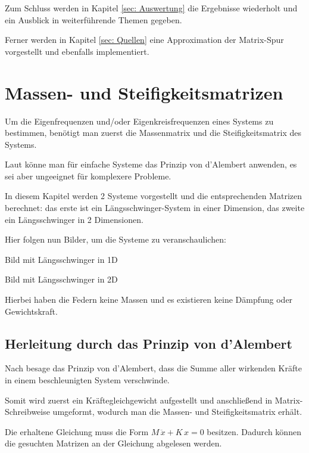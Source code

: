 \documentclass[ngerman,BCOR=4mm]{tudscrreprt}
\theoremstyle{plain} %
\theoremstyle{definition} %
\theoremstyle{remark}
\begin{document}
      Zum Schluss werden in Kapitel \ref{sec: Auswertung} die Ergebnisse wiederholt und ein Ausblick in weiterführende Themen gegeben.

      Ferner werden in Kapitel \ref{sec: Quellen} eine Approximation der Matrix-Spur vorgestellt und ebenfalls implementiert.

\chapter{Massen- und Steifigkeitsmatrizen}
\label{sec: MS Matrizen}
      Um die Eigenfrequenzen und/oder Eigenkreisfrequenzen \w eines Systems zu bestimmen, benötigt man zuerst die Massenmatrix \M und die Steifigkeitsmatrix \K des Systems.

      Laut \cite[S. 366]{maschinendynamikDresig} könne man für einfache Systeme das Prinzip von d'Alembert anwenden, es sei aber ungeeignet für komplexere Probleme.
            
      In diesem Kapitel werden 2 Systeme vorgestellt und die entsprechenden Matrizen berechnet:
      das erste ist ein Längsschwinger-System in einer Dimension, das zweite ein Längsschwinger in 2 Dimensionen.

      Hier folgen nun Bilder, um die Systeme zu veranschaulichen:

      Bild mit Längsschwinger in 1D

      Bild mit Längsschwinger in 2D

      Hierbei haben die Federn keine Massen und es existieren keine Dämpfung oder Gewichtskraft.

      \section{Herleitung durch das Prinzip von d'Alembert}
            Nach \cite{d_AlembertPrinzip} besage das Prinzip von d'Alembert, dass die Summe aller wirkenden Kräfte in einem beschleunigten System verschwinde.

            Somit wird zuerst ein Kräftegleichgewicht aufgestellt und anschließend in Matrix-Schreibweise umgeformt, wodurch man die Massen- und Steifigkeitsmatrix erhält.

            Die erhaltene Gleichung muss die Form $M\,\ddot x+K\,x = 0$ besitzen. Dadurch können die gesuchten Matrizen an der Gleichung abgelesen werden.
            
\end{document}
